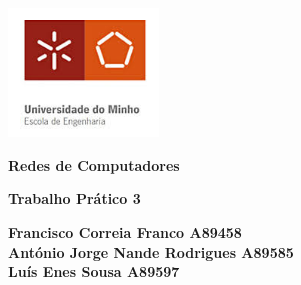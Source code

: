 \documentclass[11pt]{article}
\begin{document}
\begin{titlepage}
    \begin{center}
        \includegraphics[width=0.3\textwidth]{images/capa/EscolaEngenhariaUM.jpeg}
    
        \vspace{1cm}
        
        \textbf{\LARGE Redes de Computadores}
    
        \vspace{0.5cm}
        \textbf{\Large Trabalho Prático 3}

        \vspace{1.3cm}
        
        \textbf{\large Francisco Correia Franco A89458 \\
        António Jorge Nande Rodrigues A89585 \\
        Luís Enes Sousa A89597}

        \vspace{1.5cm}
    

\end{center}
\end{titlepage}
\end{document}
